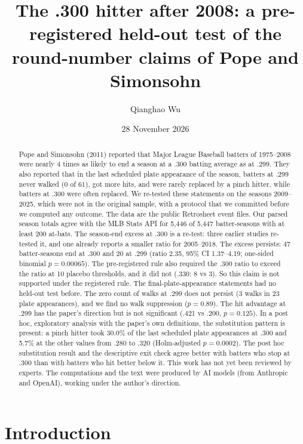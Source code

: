 \documentclass[11pt]{article}
\title{The .300 hitter after 2008: a pre-registered held-out test of the round-number claims of Pope and Simonsohn}
\author{Qianghao Wu}
\date{28 November 2026}
\begin{document}
\maketitle

\begin{abstract}
Pope and Simonsohn (2011) reported that Major League Baseball batters of 1975--2008 were nearly 4 times as likely to end a season at a .300 batting average as at .299. They also reported that in the last scheduled plate appearance of the season, batters at .299 never walked (0 of 61), got more hits, and were rarely replaced by a pinch hitter, while batters at .300 were often replaced. We re-tested these statements on the seasons 2009--2025, which were not in the original sample, with a protocol that we committed before we computed any outcome. The data are the public Retrosheet event files. Our parsed season totals agree with the MLB Stats API for 5,446 of 5,447 batter-seasons with at least 200 at-bats. The season-end excess at .300 is a re-test: three earlier studies re-tested it, and one already reports a smaller ratio for 2005--2018. The excess persists: 47 batter-seasons end at .300 and 20 at .299 (ratio 2.35, 95\% CI 1.37--4.19; one-sided binomial $p = 0.00065$). The pre-registered rule also required the .300 ratio to exceed the ratio at 10 placebo thresholds, and it did not (.330: 8 vs 3). So this claim is not supported under the registered rule. The final-plate-appearance statements had no held-out test before. The zero count of walks at .299 does not persist (3 walks in 23 plate appearances), and we find no walk suppression ($p = 0.89$). The hit advantage at .299 has the paper's direction but is not significant (.421 vs .200, $p = 0.125$). In a post hoc, exploratory analysis with the paper's own definitions, the substitution pattern is present: a pinch hitter took 30.0\% of the last scheduled plate appearances at .300 and 5.7\% at the other values from .280 to .320 (Holm-adjusted $p = 0.0002$). The post hoc substitution result and the descriptive exit check agree better with batters who stop at .300 than with batters who hit better below it. This work has not yet been reviewed by experts. The computations and the text were produced by AI models (from Anthropic and OpenAI), working under the author's direction.
\end{abstract}

\section{Introduction}
\end{document}
